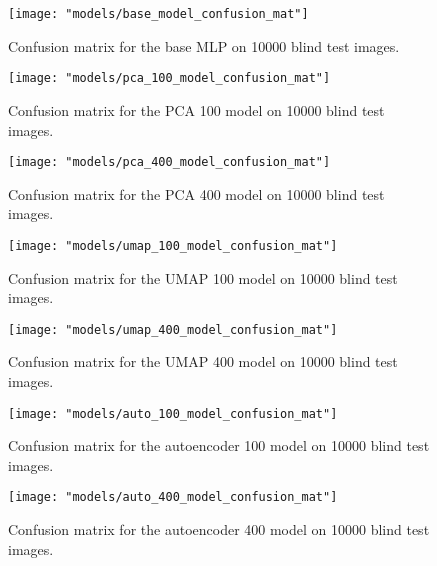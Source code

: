 \documentclass[conference]{IEEEtran}
\begin{document}
\begin{center}
	\begin{figure}[h]
		\centering
		\texttt{[image: "models/base\_model\_confusion\_mat"]}
		\caption{Confusion matrix for the base MLP on 10000 blind test images.}
		\label{fig:base_model_confusion_mat}
	\end{figure}
\end{center}
\begin{center}
	\begin{figure}[h]
		\centering
		\texttt{[image: "models/pca\_100\_model\_confusion\_mat"]}
		\caption{Confusion matrix for the PCA 100 model on 10000 blind test images.}
		\label{fig:pca_100_model_confusion_mat}
	\end{figure}
\end{center}
\begin{center}
	\begin{figure}[h]
		\centering
		\texttt{[image: "models/pca\_400\_model\_confusion\_mat"]}
		\caption{Confusion matrix for the PCA 400 model on 10000 blind test images.}
		\label{fig:pca_400_model_confusion_mat}
	\end{figure}
\end{center}
\begin{center}
	\begin{figure}[h]
		\centering
		\texttt{[image: "models/umap\_100\_model\_confusion\_mat"]}
		\caption{Confusion matrix for the UMAP 100 model on 10000 blind test images.}
		\label{fig:umap_100_model_confusion_mat}
	\end{figure}
\end{center}\begin{center}
	\begin{figure}[h]
		\centering
		\texttt{[image: "models/umap\_400\_model\_confusion\_mat"]}
		\caption{Confusion matrix for the UMAP 400 model on 10000 blind test images.}
		\label{fig:umap_400_model_confusion_mat}
	\end{figure}
\end{center}
\begin{center}
	\begin{figure}[h]
		\centering
		\texttt{[image: "models/auto\_100\_model\_confusion\_mat"]}
		\caption{Confusion matrix for the autoencoder 100 model on 10000 blind test images.}
		\label{fig:auto_100_model_confusion_mat}
	\end{figure}
\end{center}
\begin{center}
	\begin{figure}[h]
		\centering
		\texttt{[image: "models/auto\_400\_model\_confusion\_mat"]}
		\caption{Confusion matrix for the autoencoder 400 model on 10000 blind test images.}
		\label{fig:auto_400_model_confusion_mat}
	\end{figure}
\end{center} 
\end{document}
